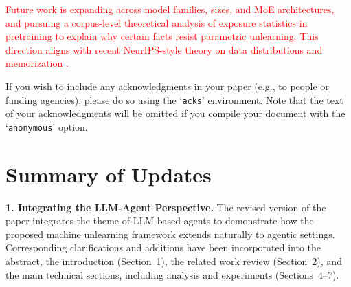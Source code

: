 \documentclass[sigconf,anonymous]{aamas}
\begin{document}
\textcolor{red}{
Future work is expanding across model families, sizes, and MoE architectures, and pursuing a corpus-level theoretical analysis of exposure statistics in pretraining to explain why certain facts resist parametric unlearning. This direction aligns with recent NeurIPS-style theory on data distributions and memorization \cite{yu2024generalizablity, sanderrethinking, mireshghallah2025position, fan2025opengu}.
}








\begin{acks}
If you wish to include any acknowledgments in your paper (e.g., to 
people or funding agencies), please do so using the `\texttt{acks}' 
environment. Note that the text of your acknowledgments will be omitted
if you compile your document with the `\texttt{anonymous}' option.
\end{acks}



 








\clearpage
\section*{Summary of Updates}

\textbf{1. Integrating the LLM-Agent Perspective.} The revised version of the paper integrates the theme of LLM-based agents to demonstrate how the proposed machine unlearning framework extends naturally to agentic settings. Corresponding clarifications and additions have been incorporated into the abstract, the introduction (Section~1), the related work review (Section~2), and the main technical sections, including analysis and experiments (Sections~4--7).
\end{document}
